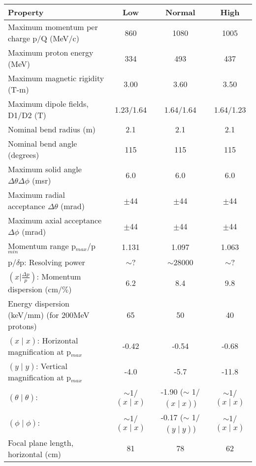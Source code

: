 \documentclass[11pt]{report}
\begin{document}
\begin{landscape}

\begin{table}
\centering
\begin{tabular}{|l|c|c|c|}
\hline
 Property &Low   &Normal   &High \\
\hline
Maximum momentum per charge p/Q (MeV/c)  &860 &1080  &1005\\
Maximum proton energy (MeV)  &334 &493 &437\\
Maximum magnetic rigidity (T-m) &3.00  &3.60  &3.50\\
Maximum dipole fields, D1/D2 (T) &1.23/1.64  &1.64/1.64 &1.64/1.23\\
Nominal bend radius (m)      &2.1&2.1&2.1 \\
Nominal bend angle (degrees)  &115&115&115\\
Maximum solid angle $\Delta\theta\Delta\phi$ (msr)   &6.0&6.0&6.0\\
Maximum radial acceptance $\Delta\theta$ (mrad)   &$\pm$44&$\pm$44&$\pm$44\\
Maximum axial acceptance $\Delta\phi$ (mrad)   &$\pm$44&$\pm$44&$\pm$44\\
Momentum range p$_{max}$/p$_{min}$  &1.131  &1.097  &1.063\\
p/$\delta$p: Resolving power    &$\sim$?&$\sim$28000&$\sim$?\\
$(x|\frac{\Delta p}{p})$: Momentum dispersion (cm/$\%$)  &6.2  &8.4  &9.8\\
Energy dispersion (keV/mm) (for 200MeV protons)  &65  &50  &40\\
$(x \mid x)$: Horizontal magnification at p$_{max}$  &-0.42 &-0.54                          &-0.68\\
$(y \mid y)$: Vertical magnification at p$_{max}$    &-4.0  &-5.7                           &-11.8\\
$(\theta \mid \theta)$:                              & $\sim$1/$(x \mid x)$    & -1.90 ($\sim$ 1/$(x \mid x)$) & $\sim$1/$(x \mid x)$   \\
$(\phi \mid \phi)$:                                  & $\sim$1/$(x \mid x)$    & -0.17 ($\sim$ 1/$(y \mid y)$) & $\sim$1/$(x \mid x)$   \\
Focal plane length, horizontal (cm)  &81  &78  &62\\

\end{tabular}
\end{table}
\end{landscape}
\end{document}
